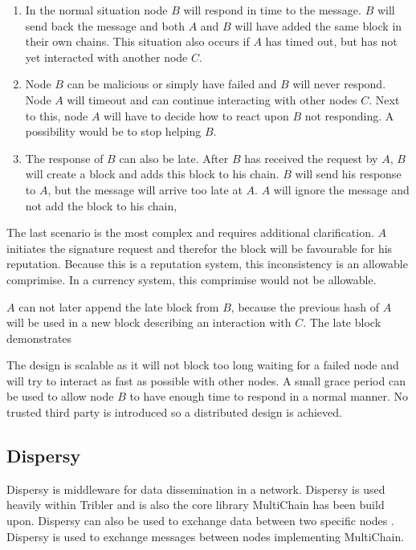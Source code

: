 \begin{enumerate}
\item
In the normal situation node $B$ will respond in time to the message.
$B$ will send back the message
and both $A$ and $B$ will have added the same block in their own chains.
This situation also occurs if $A$ has timed out,
but has not yet interacted with another node $C$.

\item
Node $B$ can be malicious or simply have failed and $B$ will never respond.
Node $A$ will timeout and can continue interacting with other nodes $C$.
Next to this, node $A$ will have to decide how to react upon $B$ not responding.
A possibility would be to stop helping $B$.

\item
The response of $B$ can also be late.
After $B$ has received the request by $A$,
$B$ will create a block and adds this block to his chain.
$B$ will send his response to $A$,
but the message will arrive too late at $A$.
$A$ will ignore the message and not add the block to his chain,
\end{enumerate}

The last scenario is the most complex and requires additional clarification.
$A$ initiates the signature request and therefor the block will be favourable for his reputation.
Because this is a reputation system, this inconsistency is an allowable comprimise.
In a currency system, this comprimise would not be allowable.

$A$ can not later append the late block from $B$,
because the previous hash of $A$ will be used in a new block describing an interaction with $C$.
The late block demonstrates 

The design is scalable as it will not block too long waiting for a failed node 
and will try to interact as fast as possible with other nodes.
A small grace period can be used to allow node $B$ to have enough time to respond in a normal manner.
No trusted third party is introduced so a distributed design is achieved.

\subsection{Dispersy}
Dispersy is middleware for data dissemination in a network.
Dispersy is used heavily within Tribler
and is also the core library MultiChain has been build upon.
Dispersy can also be used to exchange data between two specific nodes \cite{zeilemaker-dispersy}.
Dispersy is used to exchange messages between nodes implementing MultiChain.

